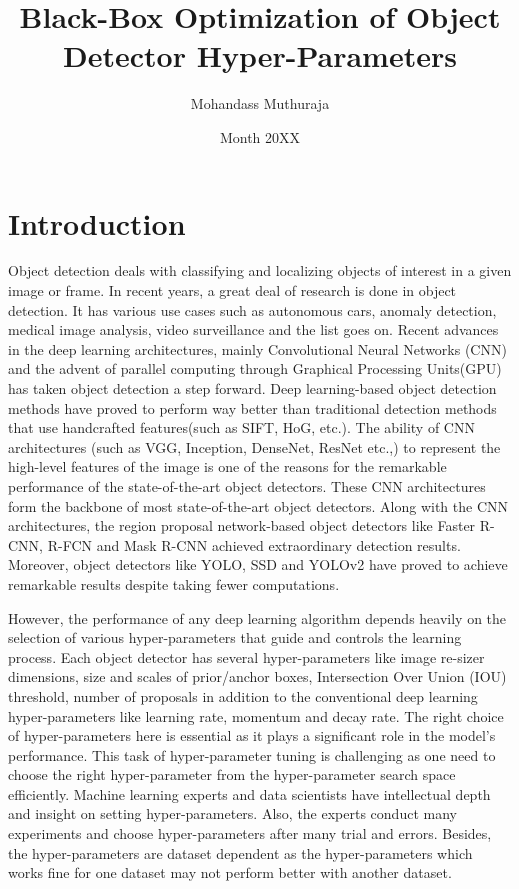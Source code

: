 \documentclass[thesis]{mas_proposal}
\title{Black-Box Optimization of Object Detector Hyper-Parameters}
\author{Mohandass Muthuraja}
\date{Month 20XX}
\begin{document}
\maketitle

\pagestyle{plain}

\section{Introduction}
Object detection deals with classifying and localizing objects of interest in a given image or frame. In recent years, a great deal of research is done in object detection. It has various use cases such as autonomous cars, anomaly detection, medical image analysis, video surveillance and the list goes on. Recent advances in the deep learning architectures, mainly Convolutional Neural Networks (CNN) and the advent of parallel computing through Graphical Processing Units(GPU) has taken object detection a step forward. Deep learning-based object detection methods have proved to perform way better than traditional detection methods that use handcrafted features(such as SIFT\cite{lowe2004distinctive}, HoG\cite{dalal2005histograms}, etc.)\cite{zou2019object}. The ability of CNN architectures (such as VGG\cite{simonyan2014very}, Inception\cite{szegedy2015going}, DenseNet\cite{huang2017densely}, ResNet\cite{he2016deep} etc.,) to represent the high-level features of the image is one of the reasons for the remarkable performance of the state-of-the-art object detectors. These CNN architectures form the backbone of most state-of-the-art object detectors. Along with the CNN architectures, the region proposal network-based object detectors like Faster R-CNN\cite{ren2015faster}, R-FCN\cite{dai2016r} and  Mask R-CNN\cite{he2017mask} achieved extraordinary detection results. Moreover, object detectors like YOLO\cite{redmon2016you}, SSD\cite{liu2016ssd} and YOLOv2\cite{redmon2017yolo9000}  have proved to achieve remarkable results despite taking fewer computations\cite{zhao2019object}. 

However, the performance of any deep learning algorithm depends heavily on the selection of various hyper-parameters that guide and controls the learning process. Each object detector has several hyper-parameters like image re-sizer dimensions, size and scales of prior/anchor boxes, Intersection Over Union (IOU) threshold, number of proposals in addition to the conventional deep learning hyper-parameters like learning rate, momentum and decay rate. The right choice of hyper-parameters here is essential as it plays a significant role in the model's performance. This task of hyper-parameter tuning is challenging as one need to choose the right hyper-parameter from the hyper-parameter search space efficiently. Machine learning experts and data scientists have intellectual depth and insight on setting hyper-parameters. Also, the experts conduct many experiments and choose hyper-parameters after many trial and errors. Besides, the hyper-parameters are dataset dependent as the hyper-parameters which works fine for one dataset may not perform better with another dataset\cite{automl_book}.
\end{document}
